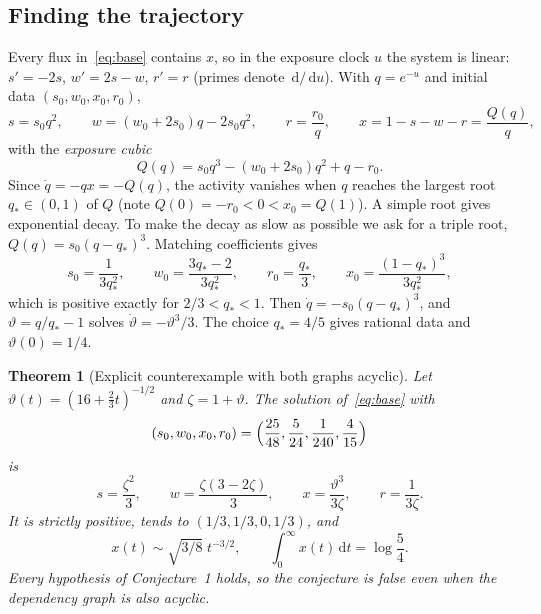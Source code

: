 \documentclass[11pt,a4paper]{article}
\newtheorem{theorem}{Theorem}[section]
\theoremstyle{definition}\newtheorem{definition}[theorem]{Definition}
\theoremstyle{remark}\newtheorem{remark}[theorem]{Remark}
\newcommand{\dd}{\,\mathrm d}
\begin{document}
\subsection{Finding the trajectory}
Every flux in~\eqref{eq:base} contains $x$, so in the exposure clock
$u$ the system is linear: $s'=-2s$, $w'=2s-w$, $r'=r$ (primes denote
$\dd/\dd u$). With $q=e^{-u}$ and initial data $(s_0,w_0,x_0,r_0)$,
\[
s=s_0q^2,\qquad w=(w_0+2s_0)q-2s_0q^2,\qquad r=\frac{r_0}q,\qquad
x=1-s-w-r=\frac{Q(q)}q,
\]
with the \emph{exposure cubic}
\begin{equation}
Q(q)=s_0q^3-(w_0+2s_0)q^2+q-r_0 .
\label{eq:cubic}
\end{equation}
Since $\dot q=-qx=-Q(q)$, the activity vanishes when $q$ reaches the
largest root $q_*\in(0,1)$ of $Q$ (note $Q(0)=-r_0<0<x_0=Q(1)$). A simple
root gives exponential decay. To make the decay as slow as possible we
ask for a triple root, $Q(q)=s_0(q-q_*)^3$. Matching coefficients gives
\begin{equation}
s_0=\frac1{3q_*^2},\qquad w_0=\frac{3q_*-2}{3q_*^2},\qquad
r_0=\frac{q_*}3,\qquad x_0=\frac{(1-q_*)^3}{3q_*^2},
\label{eq:triplefamily}
\end{equation}
which is positive exactly for $2/3<q_*<1$. Then
$\dot q=-s_0(q-q_*)^3$, and $\vartheta=q/q_*-1$ solves
$\dot\vartheta=-\vartheta^3/3$. The choice $q_*=4/5$ gives rational data
and $\vartheta(0)=1/4$.

\begin{theorem}[Explicit counterexample with both graphs acyclic]
\label{thm:base}
Let $\vartheta(t)=(16+\tfrac23t)^{-1/2}$ and $\zeta=1+\vartheta$. The
solution of~\eqref{eq:base} with
\begin{equation}
(s_0,w_0,x_0,r_0)=\Bigl(\frac{25}{48},\frac5{24},\frac1{240},\frac4{15}\Bigr)
\label{eq:baseinitial}
\end{equation}
is
\begin{equation}
s=\frac{\zeta^2}3,\qquad w=\frac{\zeta(3-2\zeta)}3,\qquad
x=\frac{\vartheta^3}{3\zeta},\qquad r=\frac1{3\zeta}.
\label{eq:base_trajectory}
\end{equation}
It is strictly positive, tends to $(1/3,1/3,0,1/3)$, and
\begin{equation}
x(t)\sim\sqrt{3/8}\;t^{-3/2},\qquad
\int_0^\infty x(t)\dd t=\log\frac54 .
\label{eq:baseresult}
\end{equation}
Every hypothesis of Conjecture~1 holds, so the conjecture is false
even when the dependency graph is also acyclic.
\end{theorem}
\end{document}

